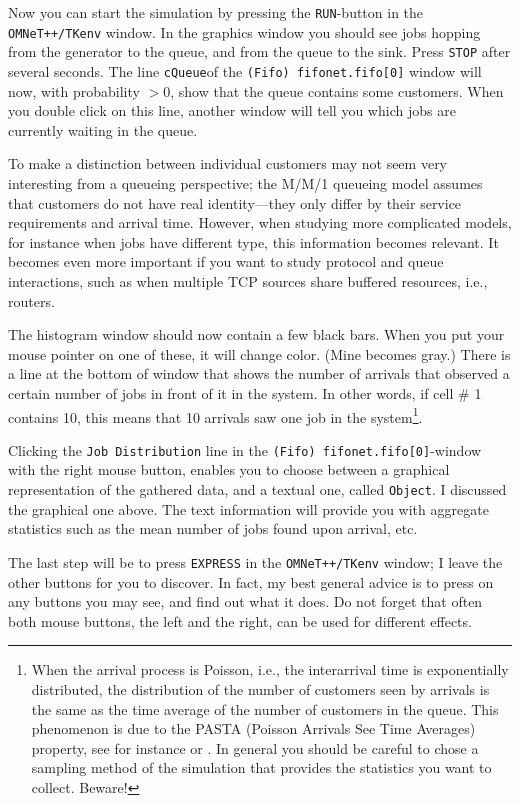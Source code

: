 \documentclass[a4paper]{article}
\begin{document}
Now you can start the simulation by pressing the \texttt{RUN}-button
in the \texttt{OMNeT++/TKenv} window. In the graphics window you
should see jobs hopping from the generator to the queue, and from the
queue to the sink.  Press \texttt{STOP} after several seconds. The
line \texttt{cQueue}of the \texttt{(Fifo) fifonet.fifo[0]} window will now,
with probability $ > 0$, show that the queue contains some customers.
When you double click on this line, another window will tell you which
jobs are currently waiting in the queue.

To make a distinction between individual customers may not seem very
interesting from a queueing perspective; the M/M/1 queueing model
assumes that customers do not have real identity---they only differ by
their service requirements and arrival time. However, when studying
more complicated models, for instance when jobs have different type,
this information becomes relevant. It becomes even more important if
you want to study protocol and queue interactions, such as when
multiple TCP sources share buffered resources, i.e., routers.

The histogram window should now contain a few black bars. When you put
your mouse pointer on one of these, it will change color. (Mine
becomes gray.) There is a line at the bottom of window that shows
the number of arrivals that observed a certain number of jobs in front
of it in the system.  In other words, if cell \# 1 contains 10, this
means that 10 arrivals saw one job in the
system\footnote{\label{fn:1}When the arrival process is Poisson, i.e.,
  the interarrival time is exponentially distributed, the distribution
  of the number of customers seen by arrivals is the same as the time
  average of the number of customers in the queue. This phenomenon is
  due to the PASTA (Poisson Arrivals See Time Averages) property, see
  for instance \cite{Ross93} or
  \cite{el-taha98:_sampl_path_analy_queuein_system}. In general you
  should be careful to chose a sampling method of the simulation that
  provides the statistics you want to collect. Beware!}.

Clicking  the \texttt{Job Distribution} line in the
\texttt{(Fifo) fifonet.fifo[0]}-window with the right mouse button, enables
you to choose between a graphical representation of the gathered data,
and a textual one, called \texttt{Object}. I discussed the graphical
one above. The text information will provide you with aggregate statistics
such as the mean number of jobs found upon arrival, etc.

The last step will be to press \texttt{EXPRESS} in the
\texttt{OMNeT++/TKenv} window; I leave the other
buttons for you to discover. In fact, my best general advice is to
press on any buttons you may see, and find out what it does. Do not
forget that often both mouse buttons, the left and the right, can be
used for different effects.
\end{document}
